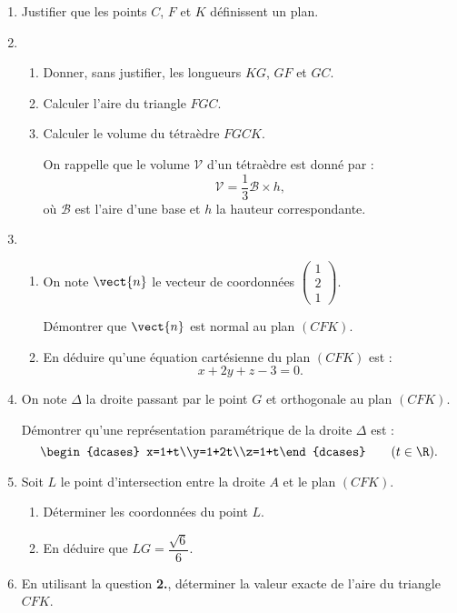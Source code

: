 \begin{enumerate}
	\item Justifier que les points $C$, $F$ et $K$ définissent un plan.
	\item 
	\begin{enumerate}
		\item Donner, sans justifier, les longueurs $KG$, $GF$ et $GC$.
		\item Calculer l'aire du triangle $FGC$.
		\item Calculer le volume du tétraèdre $FGCK$.
		
		\bigskip
		
		On rappelle que le volume $\mathcal{V}$ d'un tétraèdre est donné par :%
		\[ \mathcal{V}=\frac13 \mathcal{B} \times h, \]%
		où $\mathcal{B}$ est l'aire d'une base et $h$ la hauteur correspondante.\hfill~%
	\end{enumerate}
	\item 
	\begin{enumerate}
		\item On note $\vect{n}$ le vecteur de coordonnées $\begin{pmatrix}1\\2\\1\end{pmatrix}$.
		
		Démontrer que $\vect{n}$ est normal au plan $(CFK)$.
		\item En déduire qu'une équation cartésienne du plan $(CFK)$ est :%
		\[ x+2y+z-3=0. \]
	\end{enumerate}
	\item On note $\Delta$ la droite passant par le point $G$ et orthogonale au plan $(CFK)$.
	
	Démontrer qu'une représentation paramétrique de la droite $\Delta$ est :%
	\[ \begin{dcases} x=1+t\\y=1+2t\\z=1+t\end{dcases} \qquad (t \in \R). \]
	\item Soit $L$ le point d'intersection entre la droite $A$ et le plan $(CFK)$.
	\begin{enumerate}
		\item Déterminer les coordonnées du point $L$.
		\item En déduire que $LG = \dfrac{\sqrt{6}}{6}$.
	\end{enumerate}
	\item En utilisant la question \textbf{2.}, déterminer la valeur exacte de l'aire du triangle $CFK$.
\end{enumerate}
